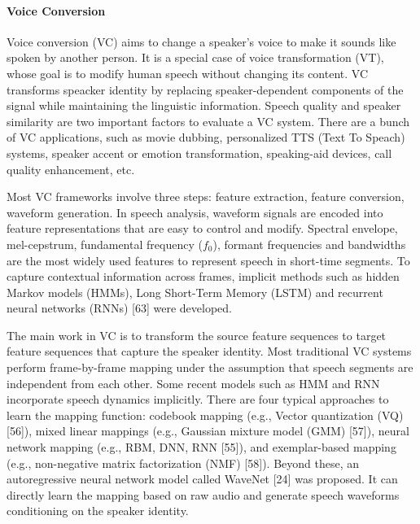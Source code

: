 \documentclass{article}
\begin{document}
\paragraph{Voice Conversion}
Voice conversion (VC) aims to change a speaker's voice to make it sounds like spoken by another person. It is a special case of voice transformation (VT), whose goal is to modify human speech without changing its content. VC transforms speacker identity by replacing speaker-dependent components of the signal while maintaining the linguistic information. Speech quality and speaker similarity are two important factors to evaluate a VC system. There are a bunch of VC applications, such as movie dubbing, personalized TTS (Text To Speach) systems, speaker accent or emotion transformation, speaking-aid devices, call quality enhancement, etc.

Most VC frameworks involve three steps: feature extraction, feature conversion, waveform generation. In speech analysis, waveform signals are encoded into feature representations that are easy to control and modify. Spectral envelope, mel-cepstrum, fundamental frequency ($f_0$), formant frequencies and bandwidths are the most widely used features to represent speech in short-time segments. To capture contextual information across frames, implicit methods such as hidden Markov models (HMMs), Long Short-Term Memory (LSTM) and recurrent neural networks (RNNs) [63] were developed.

The main work in VC is to transform the source feature sequences to target feature sequences that capture the speaker identity. Most traditional VC systems perform frame-by-frame mapping under the assumption that speech segments are independent from each other. Some recent models such as HMM and RNN incorporate speech dynamics implicitly. There are four typical approaches to learn the mapping function: codebook mapping (e.g., Vector quantization (VQ) [56]), mixed linear mappings (e.g., Gaussian mixture model (GMM) [57]), neural network mapping (e.g., RBM, DNN, RNN [55]), and exemplar-based mapping (e.g., non-negative matrix factorization (NMF) [58]). Beyond these, an autoregressive neural network model called WaveNet [24] was proposed. It can directly learn the mapping based on raw audio and generate speech waveforms conditioning on the speaker identity.
\end{document}
